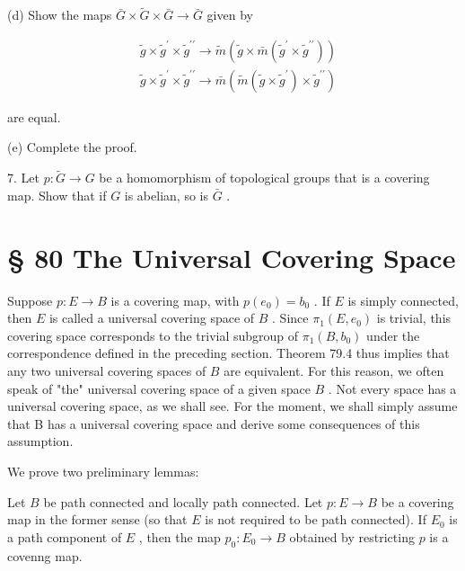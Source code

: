 (d) Show the maps \(\bar{G} \times  \widetilde{G} \times  \bar{G} \rightarrow  \bar{G}\) given by

\[
\begin{aligned}  & \widetilde{g} \times  {\widetilde{g}}^{\prime } \times  {\widetilde{g}}^{\prime \prime } \rightarrow  \widetilde{m}\left( {\widetilde{g} \times  \bar{m}\left( {{\widetilde{g}}^{\prime } \times  {\widetilde{g}}^{\prime \prime }}\right) }\right) \\  & \widetilde{g} \times  {\widetilde{g}}^{\prime } \times  {\widetilde{g}}^{\prime \prime } \rightarrow  \bar{m}\left( {\widetilde{m}\left( {\widetilde{g} \times  {\widetilde{g}}^{\prime }}\right)  \times  {\widetilde{g}}^{\prime \prime }}\right) \end{aligned}
\]

are equal.

(e) Complete the proof.

7. Let \(p : \widetilde{G} \rightarrow  G\) be a homomorphism of topological groups that is a covering map. Show that if \(G\) is abelian, so is \(\bar{G}\) .

\section*{§ 80 The Universal Covering Space}

Suppose \(p : E \rightarrow  B\) is a covering map, with \(p\left( {e}_{0}\right)  = {b}_{0}\) . If \(E\) is simply connected, then \(E\) is called a universal covering space of \(B\) . Since \({\pi }_{1}\left( {E,{e}_{0}}\right)\) is trivial, this covering space corresponds to the trivial subgroup of \({\pi }_{1}\left( {B,{b}_{0}}\right)\) under the correspondence defined in the preceding section. Theorem 79.4 thus implies that any two universal covering spaces of \(B\) are equivalent. For this reason, we often speak of "the" universal covering space of a given space \(B\) . Not every space has a universal covering space, as we shall see. For the moment, we shall simply assume that B has a universal covering space and derive some consequences of this assumption.

We prove two preliminary lemmas:

\begin{lemma} Let \(B\) be path connected and locally path connected. Let \(p : E \rightarrow  B\) be a covering map in the former sense (so that \(E\) is not required to be path connected). If \({E}_{0}\) is a path component of \(E\) , then the map \({p}_{0} : {E}_{0} \rightarrow  B\) obtained by restricting \(p\) is a covenng map.
\end{lemma}

